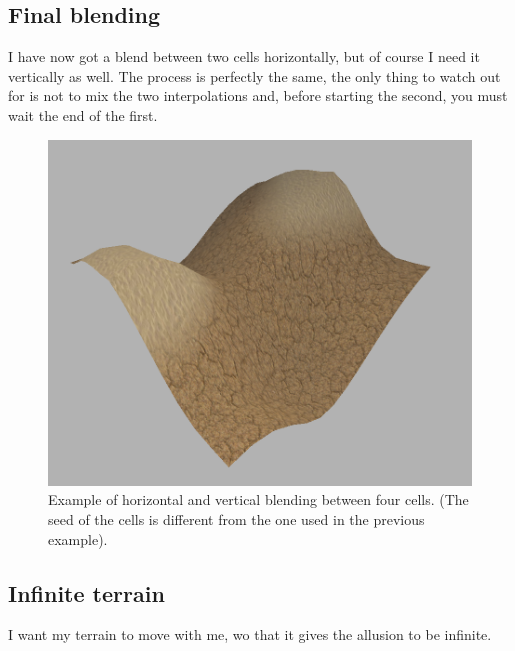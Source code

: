 \subsection{Final blending}
I have now got a blend between two cells horizontally, but of course I need it vertically as well. The process is perfectly the same, the only thing to watch out for is not to mix the two interpolations and, before starting the second, you must wait the end of the first.

\begin{figure}[hbt!]
	\centering
	\includegraphics[width= 1
	\textwidth]{images/terrain8.png}
	\caption{Example of horizontal and vertical blending between four cells. (The seed of the cells is different from the one used in the previous example).}
\end{figure} 


\subsection{Infinite terrain}
\label{sub::infinteTerrain}
I want my terrain to move with me, wo that it gives the allusion to be infinite. 